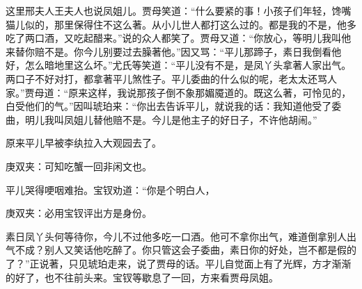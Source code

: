 \begin{parag}
    这里邢夫人王夫人也说凤姐儿。贾母笑道：“什么要紧的事！小孩子们年轻，馋嘴猫儿似的，那里保得住不这么著。从小儿世人都打这么过的。都是我的不是，他多吃了两口酒，又吃起醋来。”说的众人都笑了。贾母又道：“你放心，等明儿我叫他来替你赔不是。你今儿别要过去臊著他。”因又骂：“平儿那蹄子，素日我倒看他好，怎么暗地里这么坏。”尤氏等笑道：“平儿没有不是，是凤丫头拿著人家出气。两口子不好对打，都拿著平儿煞性子。平儿委曲的什么似的呢，老太太还骂人家。”贾母道：“原来这样，我说那孩子倒不象那媚魇道的。既这么著，可怜见的，白受他们的气。”因叫琥珀来：“你出去告诉平儿，就说我的话：我知道他受了委曲，明儿我叫凤姐儿替他赔不是。今儿是他主子的好日子，不许他胡闹。”
\end{parag}


\begin{parag}
    原来平儿早被李纨拉入大观园去了。\begin{note}庚双夹：可知吃蟹一回非闲文也。\end{note}平儿哭得哽咽难抬。宝钗劝道：“你是个明白人，\begin{note}庚双夹：必用宝钗评出方是身份。\end{note}素日凤丫头何等待你，今儿不过他多吃一口酒。他可不拿你出气，难道倒拿别人出气不成？别人又笑话他吃醉了。你只管这会子委曲，素日你的好处，岂不都是假的了？”正说著，只见琥珀走来，说了贾母的话。平儿自觉面上有了光辉，方才渐渐的好了，也不往前头来。宝钗等歇息了一回，方来看贾母凤姐。
\end{parag}


